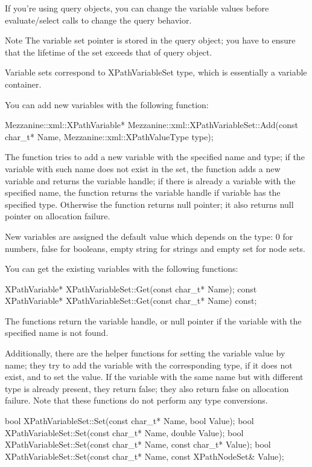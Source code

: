  If you're using query objects, you can change the variable values before evaluate/select calls to change the query behavior. \begin{DoxyNote}{Note}
The variable set pointer is stored in the query object; you have to ensure that the lifetime of the set exceeds that of query object.
\end{DoxyNote}
Variable sets correspond to XPathVariableSet type, which is essentially a variable container. \par
 \par
 You can add new variables with the following function: 
\begin{DoxyCode}
 Mezzanine::xml::XPathVariable* Mezzanine::xml::XPathVariableSet::Add(const 
      char_t* Name, Mezzanine::xml::XPathValueType type);
\end{DoxyCode}
 The function tries to add a new variable with the specified name and type; if the variable with such name does not exist in the set, the function adds a new variable and returns the variable handle; if there is already a variable with the specified name, the function returns the variable handle if variable has the specified type. Otherwise the function returns null pointer; it also returns null pointer on allocation failure. \par
 \par
 New variables are assigned the default value which depends on the type: 0 for numbers, false for booleans, empty string for strings and empty set for node sets. \par
 \par
 You can get the existing variables with the following functions: 
\begin{DoxyCode}
 XPathVariable* XPathVariableSet::Get(const char_t* Name);
 const XPathVariable* XPathVariableSet::Get(const char_t* Name) const;
\end{DoxyCode}
 The functions return the variable handle, or null pointer if the variable with the specified name is not found. \par
 \par
 Additionally, there are the helper functions for setting the variable value by name; they try to add the variable with the corresponding type, if it does not exist, and to set the value. If the variable with the same name but with different type is already present, they return false; they also return false on allocation failure. Note that these functions do not perform any type conversions. 
\begin{DoxyCode}
 bool XPathVariableSet::Set(const char_t* Name, bool Value);
 bool XPathVariableSet::Set(const char_t* Name, double Value);
 bool XPathVariableSet::Set(const char_t* Name, const char_t* Value);
 bool XPathVariableSet::Set(const char_t* Name, const XPathNodeSet& Value);
\end{DoxyCode}
